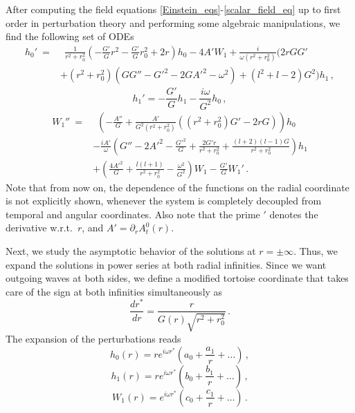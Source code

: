 \documentclass[11pt,a4paper]{article}
\begin{document}
After computing the field equations \eqref{Einstein_eqs}-\eqref{scalar_field_eq} up to first order in perturbation theory and performing some algebraic manipulations, we find the following set of ODEs
%
\begin{equation}\label{eq_h0_axial}
\begin{split}
    h_0'\:= & \:\:\frac{1}{r^2+r_0^2}\left(-\frac{G'}{G}r^2-\frac{G'}{G}r_0^2+2r\right)h_0-4A'W_1+\frac{i}{\omega(r^2+r_0^2)}\biggl(2rGG' \\
    & + (r^2+r_0^2)(GG''-G'^2-2GA'^2-\omega^2)+(l^2+l-2)G^2\biggr)h_1\,,
\end{split}
\end{equation}
%
\begin{equation}\label{eq_h1_axial}
    h_1'=-\frac{G'}{G}h_1-\frac{i\omega}{G^2}h_0 \,,
\end{equation}
%
\begin{equation}\label{eq_W1_axial}
    \begin{split}
    W_1''\:= & \:\:\left(-\frac{A''}{G}+\frac{A'}{G^2(r^2+r_0^2)}\left((r^2+r_0^2)G'-2rG\right)\right)h_0\\
    & -\frac{iA'}{\omega}\left(G''-2A'^2-\frac{G'^2}{G}+\frac{2G'r}{r^2+r_0^2}+\frac{(l+2)(l-1)G}{r^2+r_0^2}\right)h_1\\
    & +\left(\frac{4A'^2}{G}+\frac{l(l+1)}{r^2+r_0^2}-\frac{\omega^2}{G^2}\right)W_1-\frac{G'}{G}W_1'\,.
\end{split}
\end{equation}
%
Note that from now on, the dependence of the functions on the radial coordinate is not explicitly shown, whenever the system is completely decoupled from temporal and angular coordinates. 
Also note that the prime $'$ denotes the derivative w.r.t.~$r$, and $A'=\partial_r A^0_{t}(r)$.

Next, we study the asymptotic behavior of the solutions at $r=\pm\infty$. 
Thus, we expand the solutions in power series at both radial infinities. 
Since we want outgoing waves at both sides, we define a modified tortoise coordinate that takes care of the sign at both infinities simultaneously as
%
\begin{equation}\label{tortoise}
    \frac{dr^*}{dr}=\frac{r}{G(r)\sqrt{r^2+r_0^2}} \, .
\end{equation}
%
The expansion of the perturbations reads
%
\begin{equation}
    h_0(r)=re^{i\omega r^*}\left(a_0+\frac{a_1}{r}+\dots\right) \,,
\end{equation}
%
\begin{equation}
    h_1(r)=re^{i\omega r^*}\left(b_0+\frac{b_1}{r}+\dots\right) \,,
\end{equation}
%
\begin{equation}
    W_1(r)=e^{i\omega r^*}\left(c_0+\frac{c_1}{r}+\dots\right) \,.
\end{equation}
\end{document}
